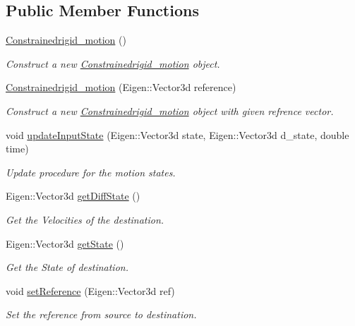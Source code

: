 \subsection*{Public Member Functions}
\begin{DoxyCompactItemize}
\item 
\hyperlink{group__RigidMotion_ga2754df22fa5a20dfc6094c33258f13e2}{Constrainedrigid\+\_\+motion} ()
\begin{DoxyCompactList}\small\item\em Construct a new \hyperlink{classConstrainedrigid__motion}{Constrainedrigid\+\_\+motion} object. \end{DoxyCompactList}\item 
\hyperlink{group__RigidMotion_ga1db11e0353c9a9f08e78fb935b0cee96}{Constrainedrigid\+\_\+motion} (Eigen\+::\+Vector3d reference)
\begin{DoxyCompactList}\small\item\em Construct a new \hyperlink{classConstrainedrigid__motion}{Constrainedrigid\+\_\+motion} object with given refrence vector. \end{DoxyCompactList}\item 
void \hyperlink{group__RigidMotion_ga67803463eb8fcb37eec415292fa6a13f}{update\+Input\+State} (Eigen\+::\+Vector3d state, Eigen\+::\+Vector3d d\+\_\+state, double time)
\begin{DoxyCompactList}\small\item\em Update procedure for the motion states. \end{DoxyCompactList}\item 
Eigen\+::\+Vector3d \hyperlink{group__RigidMotion_ga8540758697945dc27502fcb557bb4871}{get\+Diff\+State} ()
\begin{DoxyCompactList}\small\item\em Get the Velocities of the destination. \end{DoxyCompactList}\item 
Eigen\+::\+Vector3d \hyperlink{group__RigidMotion_ga1a34b67dd58d3137628811dfab7f54a1}{get\+State} ()
\begin{DoxyCompactList}\small\item\em Get the State of destination. \end{DoxyCompactList}\item 
void \hyperlink{group__RigidMotion_ga2cc2728f1d7865deea62a7fe540eee1a}{set\+Reference} (Eigen\+::\+Vector3d ref)
\begin{DoxyCompactList}\small\item\em Set the reference from source to destination. \end{DoxyCompactList}\end{DoxyCompactItemize}
